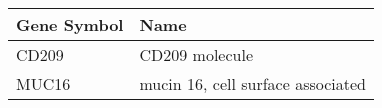 \begin{tabular}{ll}
\toprule
Gene Symbol &                              Name \\
\midrule
      CD209 &                    CD209 molecule \\
      MUC16 & mucin 16, cell surface associated \\
\bottomrule
\end{tabular}
